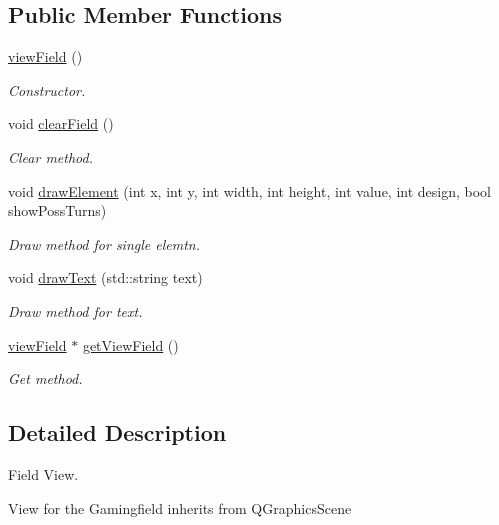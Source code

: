 \subsection*{Public Member Functions}
\begin{DoxyCompactItemize}
\item 
\hypertarget{classviewField_a2d66d79d5b2ef951572b34d4ead4765f}{\hyperlink{classviewField_a2d66d79d5b2ef951572b34d4ead4765f}{view\+Field} ()}\label{classviewField_a2d66d79d5b2ef951572b34d4ead4765f}

\begin{DoxyCompactList}\small\item\em Constructor. \end{DoxyCompactList}\item 
void \hyperlink{classviewField_a473626a4891aa58b7db2b5504c4e27be}{clear\+Field} ()
\begin{DoxyCompactList}\small\item\em Clear method. \end{DoxyCompactList}\item 
void \hyperlink{classviewField_a2616089553a98834a84524460aceae16}{draw\+Element} (int x, int y, int width, int height, int value, int design, bool show\+Poss\+Turns)
\begin{DoxyCompactList}\small\item\em Draw method for single elemtn. \end{DoxyCompactList}\item 
void \hyperlink{classviewField_a15947b1c9f5f01bffc5263238e36ee98}{draw\+Text} (std\+::string text)
\begin{DoxyCompactList}\small\item\em Draw method for text. \end{DoxyCompactList}\item 
\hyperlink{classviewField}{view\+Field} $\ast$ \hyperlink{classviewField_aef0bf7d75efa322d40a8ae138fd6cb41}{get\+View\+Field} ()
\begin{DoxyCompactList}\small\item\em Get method. \end{DoxyCompactList}\end{DoxyCompactItemize}


\subsection{Detailed Description}
Field View. 

View for the Gamingfield inherits from Q\+Graphics\+Scene 


